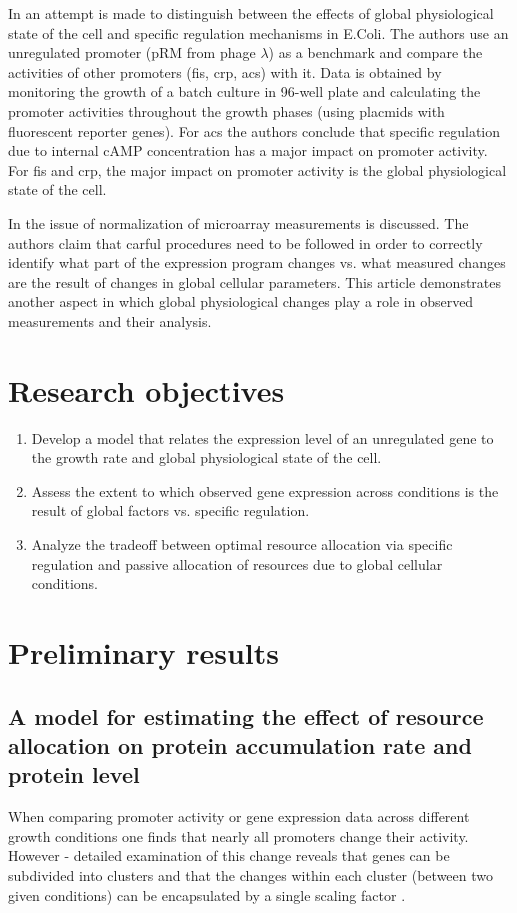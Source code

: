 \documentclass{report}
\begin{document}
In \cite{Berthoumieux2013} an attempt is made to distinguish between the effects of global physiological state of the cell and specific regulation mechanisms in E.Coli.
The authors use an unregulated promoter (pRM from phage $\lambda$) as a benchmark and compare the activities of other promoters (fis, crp, acs) with it.
Data is obtained by monitoring the growth of a batch culture in 96-well plate and calculating the promoter activities throughout the growth phases (using placmids with fluorescent reporter genes).
For acs the authors conclude that specific regulation due to internal cAMP concentration has a major impact on promoter activity.
For fis and crp, the major impact on promoter activity is the global physiological state of the cell.

In \cite{loven2012} the issue of normalization of microarray measurements is discussed.
The authors claim that carful procedures need to be followed in order to correctly identify what part of the expression program changes vs. what measured changes are the result of changes in global cellular parameters.
This article demonstrates another aspect in which global physiological changes play a role in observed measurements and their analysis.

\section{Research objectives}
\begin{enumerate}
\item Develop a model that relates the expression level of an unregulated gene to the growth rate and global physiological state of the cell.
\item Assess the extent to which observed gene expression across conditions is the result of global factors vs. specific regulation.
\item Analyze the tradeoff between optimal resource allocation via specific regulation and passive allocation of resources due to global cellular conditions.
\end{enumerate}
\section{Preliminary results}
\subsection{A model for estimating the effect of resource allocation on protein accumulation rate and protein level}
When comparing promoter activity or gene expression data across different growth conditions one finds that nearly all promoters change their activity.
However - detailed examination of this change reveals that genes can be subdivided into clusters and that the changes within each cluster (between two given conditions) can be encapsulated by a single scaling factor \cite{Leeat2013}.
\end{document}
